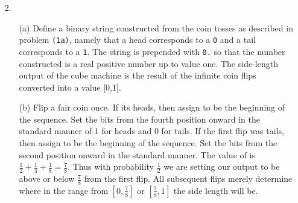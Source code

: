 \documentclass{article}
\begin{document}
\begin{enumerate}
\newpage

\item[2.]
	\begin{enumerate}
	\item[(a)] 
		Define a binary string constructed from the coin tosses as described in problem \texttt{(1a)}, namely that a head corresponds to a  \texttt{0} and a tail corresponds to a  \texttt{1}. The string is prepended with \texttt{0.} so that the number constructed is a real positive number up to value one. The side-length output of the cube machine is the result of the infinite coin flips converted into a value [0,1].
	\item[(b)] 
		Flip a fair coin once. If its heads, then assign  to be the beginning of the sequence. Set the bits from the fourth position onward in the standard manner of 1 for heads and 0 for tails. If the first flip was tails, then assign  to be the beginning of the sequence. Set the bits from the second position onward in the standard manner. The value of  is $\frac{1}{2} + \frac{1}{4} + \frac{1}{8} = \frac{7}{8}$. Thus with probability $\frac{1}{2}$ we are setting our output to be above or below $\frac{7}{8}$ from the first flip. All subsequent flips merely determine where in the range from $[0,\frac{7}{8}]$ or $[\frac{7}{8},1]$ the side length will be.
	\end{enumerate}

\bigskip


\end{enumerate}
\end{document}
